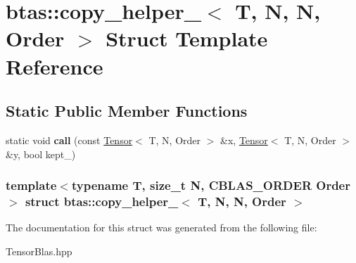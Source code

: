 \hypertarget{structbtas_1_1copy__helper___3_01_t_00_01_n_00_01_n_00_01_order_01_4}{
\section{btas::copy\_\-helper\_\-$<$ T, N, N, Order $>$ Struct Template Reference}
\label{structbtas_1_1copy__helper___3_01_t_00_01_n_00_01_n_00_01_order_01_4}
}
\subsection*{Static Public Member Functions}
\begin{DoxyCompactItemize}
\item 
\hypertarget{structbtas_1_1copy__helper___3_01_t_00_01_n_00_01_n_00_01_order_01_4_a0dfe53aa447df827374bba8b6faaa60c}{
static void {\bfseries call} (const \hyperlink{classbtas_1_1_tensor}{Tensor}$<$ T, N, Order $>$ \&x, \hyperlink{classbtas_1_1_tensor}{Tensor}$<$ T, N, Order $>$ \&y, bool kept\_\-)}
\label{structbtas_1_1copy__helper___3_01_t_00_01_n_00_01_n_00_01_order_01_4_a0dfe53aa447df827374bba8b6faaa60c}

\end{DoxyCompactItemize}
\subsubsection*{template$<$typename T, size\_\-t N, CBLAS\_\-ORDER Order$>$ struct btas::copy\_\-helper\_\-$<$ T, N, N, Order $>$}



The documentation for this struct was generated from the following file:\begin{DoxyCompactItemize}
\item 
TensorBlas.hpp\end{DoxyCompactItemize}
